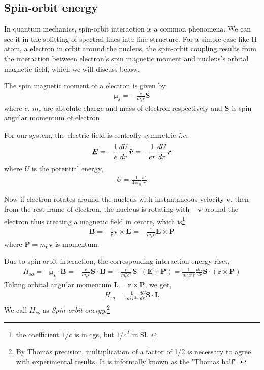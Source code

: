 \documentclass[11pt,a4paper]{article}
\numberwithin{equation}{section}
\begin{document}
\subsection{Spin-orbit energy}
In quantum mechanics, spin-orbit interaction is a common phenomena. We can see it in the splitting of spectral lines into fine structure. For a simple case like H atom, a electron in orbit around the nucleus, the spin-orbit coupling results from the interaction between electron's spin magnetic moment and nucleus's orbital magnetic field, which we will discuss below. \cite{WO}\cite{zettili 09} 

The spin magnetic moment of a electron is given by
\begin{align}
	\boldsymbol{\mu_s}=-\frac{e}{m_ec}\boldsymbol{S}
\end{align}
where $e$, $m_e$ are absolute charge and mass of electron respectively and $\boldsymbol{S}$ is spin angular momentum of electron.

For our system, the electric field is centrally symmetric \textit{i.e.}
\begin{align}
	\boldsymbol{E}= -\frac{1}{e}\frac{dU}{dr}\Hat{\boldsymbol{r}}= -\frac{1}{er}\frac{dU}{dr}\boldsymbol{r}
\end{align} where $U$ is the potential energy, 
\begin{align}
	U = \frac{1}{4\pi\epsilon_0}\frac{e^2}{r}
\end{align}

Now if electron rotates around the nucleus with instantaneous velocity $\boldsymbol{v}$, then from the rest frame of electron, the nucleus is rotating with $-\boldsymbol{v}$ around the electron thus creating a magnetic field in centre, which is\footnote{the coefficient $1/c$ is in cgs, but $1/c^2$ in SI. \cite{relativity -wiki}} 
\begin{align}
	\boldsymbol{B} = -\frac{1}{c} \boldsymbol{v}\times\boldsymbol{E} = -\frac{1}{m_ec}\boldsymbol{E}\times\boldsymbol{P}
\end{align}where $\boldsymbol{P}=m_e\boldsymbol{v}$ is momentum.

Due to spin-orbit interaction, the corresponding interaction energy rises,
\begin{align}
	H_{so}= -\boldsymbol{\mu_s}\cdot \boldsymbol{B} = -\frac{e}{m_ec}\boldsymbol{S}\cdot\boldsymbol{B} =
	-\frac{e}{m_e^2c^2}\boldsymbol{S}\cdot(\boldsymbol{E}\times\boldsymbol{P}) 
	=\frac{1}{m_e^2c^2r}\frac{dU}{dr}\boldsymbol{S}\cdot(\boldsymbol{r}\times\boldsymbol{P})
\end{align} Taking orbital angular momentum $\boldsymbol{L}=\boldsymbol{r}\times\boldsymbol{P}$, we get,
\begin{align}
	H_{so}=\frac{1}{m_e^2c^2r}\frac{dU}{dr}\boldsymbol{S}\cdot\boldsymbol{L}
\end{align}
We call $H_{so}$ as \textit{Spin-orbit energy}.\footnote{By Thomas precision, multiplication of a factor of 1/2 is necessary to agree with experimental results. It is informally known as the "Thomas half". \cite{thomas}}
\end{document}
